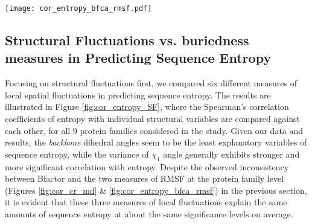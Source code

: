 \documentclass[preprint,12pt]{article}
\begin{document}
            \begin{figure*}[t]
            \begin{center}
                \texttt{[image: cor\_entropy\_bfca\_rmsf.pdf]}
            \end{center}
            \caption{
                     {\bf RMSF vs. Bfactor in sequence entropy prediction.} {\bf (A)} Comparison of the Spearman's rank correlation coefficients of entropy--RMSF with entropy-Bfactor. Each black dot represents one protein structure. {\bf (B)} Comparison of the Spearman's rank correlation coefficients of entropy--RMSF with entropy--Bfactor. Each black dot represents one protein structure for which there were adequate number of homologous structures in the Protein Data Bank, in order to calculate RMSF. As evidenced from the data in the plots, the three different measures of site-specific structural flexibility -- MD RMSF, CS RMSF, and Bfactor -- are inconsistent with each other.
                     }
            \label{fig:cor_entropy_bfca_rmsf}
            \end{figure*}

        \subsection{Structural Fluctuations vs. buriedness measures in Predicting Sequence Entropy}

            Focusing on structural fluctuations first, we compared six different measures of local spatial fluctuations in predicting sequence entropy. The results are illustrated in Figure \ref{fig:cor_entropy_SF}, where the Spearman's correlation coefficients of entropy with individual structural variables are compared against each other, for all $9$ protein families considered in the study. Given our data and results, the {\it backbone} dihedral angles seem to be the least explanatory variables of sequence entropy, while the variance of $\chi_1$ angle generally exhibits stronger and more significant correlation with entropy. Despite the observed inconsistency between Bfactor and the two measures of RMSF at the protein family level (Figures \ref{fig:cor_cr_md} \& \ref{fig:cor_entropy_bfca_rmsf}) in the previous section, it is evident that these three measures of local fluctuations explain the same amounts of sequence entropy at about the same significance levels on average.
\end{document}
